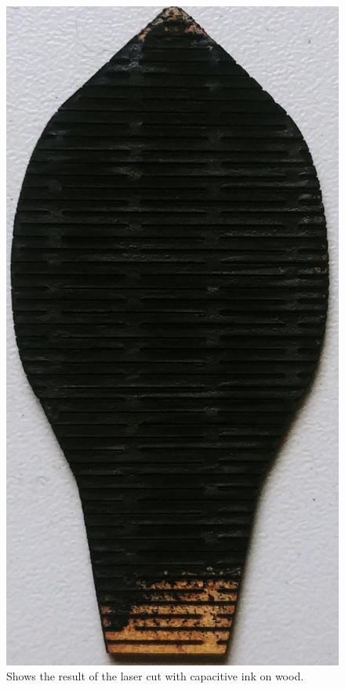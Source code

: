 \documentclass[04.3_buildingProcess.tex]{subfiles}
\begin{document}
\begin{flushleft}
        \begin{figure}[h!]
            \centering
            \includegraphics[scale=0.05]{images/materialProcess/07_LaserCut.jpg}
            \caption{Shows the result of the laser cut with capacitive ink on wood.}
            \label{fig:07_LaserCut}
        \end{figure}


\end{flushleft}
\end{document}
